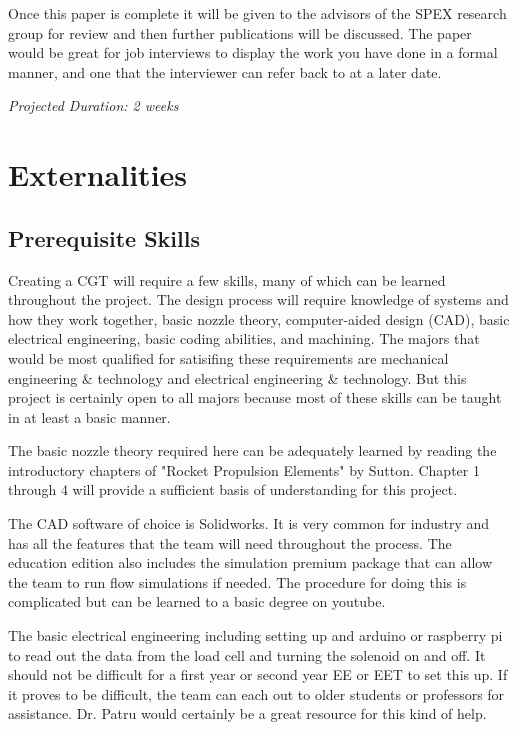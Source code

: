 \documentclass[conference]{IEEEtran} %
\begin{document}
    Once this paper is complete it will be given to the advisors of the SPEX research group for review and then further publications will be discussed. The paper would
    be great for job interviews to display the work you have done in a formal manner, and one that the interviewer can refer back to at a later date.

    \textit{Projected Duration: 2 weeks}

\section{Externalities}
\subsection{Prerequisite Skills}

Creating a CGT will require a few skills, many of which can be learned throughout the project. The design process will require knowledge of systems and how they
work together, basic nozzle theory, computer-aided design (CAD), basic electrical engineering, basic coding abilities, and machining. The majors that would
be most qualified for satisifing these requirements are mechanical engineering \& technology and electrical engineering \& technology. But this project is certainly
open to all majors because most of these skills can be taught in at least a basic manner.

The basic nozzle theory required here can be adequately learned by reading the introductory chapters of "Rocket Propulsion Elements" by Sutton. Chapter 1 through 4 will
provide a sufficient basis of understanding for this project.

 The CAD software of choice is Solidworks. It is very common for industry and has all the features that the team
will need throughout the process. The education edition also includes the simulation premium package that can allow the team to run flow simulations if needed. The procedure for
doing this is complicated but can be learned to a basic degree on youtube.

The basic electrical engineering including setting up and arduino or raspberry pi to read out the data from the load cell and turning the solenoid on and off. It
should not be difficult for a first year or second year EE or EET to set this up. If it proves to be difficult, the team can each out to older students or professors for assistance.
Dr. Patru would certainly be a great resource for this kind of help.
\end{document}
